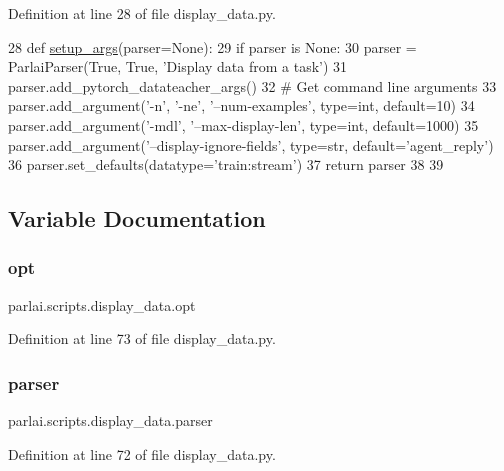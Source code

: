 Definition at line 28 of file display\+\_\+data.\+py.


\begin{DoxyCode}
28 \textcolor{keyword}{def }\hyperlink{namespaceparlai_1_1scripts_1_1display__data_a666e6177939b9a63961e56a1dfdc74b4}{setup\_args}(parser=None):
29     \textcolor{keywordflow}{if} parser \textcolor{keywordflow}{is} \textcolor{keywordtype}{None}:
30         parser = ParlaiParser(\textcolor{keyword}{True}, \textcolor{keyword}{True}, \textcolor{stringliteral}{'Display data from a task'})
31     parser.add\_pytorch\_datateacher\_args()
32     \textcolor{comment}{# Get command line arguments}
33     parser.add\_argument(\textcolor{stringliteral}{'-n'}, \textcolor{stringliteral}{'-ne'}, \textcolor{stringliteral}{'--num-examples'}, type=int, default=10)
34     parser.add\_argument(\textcolor{stringliteral}{'-mdl'}, \textcolor{stringliteral}{'--max-display-len'}, type=int, default=1000)
35     parser.add\_argument(\textcolor{stringliteral}{'--display-ignore-fields'}, type=str, default=\textcolor{stringliteral}{'agent\_reply'})
36     parser.set\_defaults(datatype=\textcolor{stringliteral}{'train:stream'})
37     \textcolor{keywordflow}{return} parser
38 
39 
\end{DoxyCode}


\subsection{Variable Documentation}
\mbox{\label{namespaceparlai_1_1scripts_1_1display__data_a341b3b511b1950a639f21228dd77a5c1}} 
\subsubsection{\texorpdfstring{opt}{opt}}
{\footnotesize\ttfamily parlai.\+scripts.\+display\+\_\+data.\+opt}



Definition at line 73 of file display\+\_\+data.\+py.

\mbox{\label{namespaceparlai_1_1scripts_1_1display__data_a43745c48943804e2c6a6d8d3085e1877}} 
\subsubsection{\texorpdfstring{parser}{parser}}
{\footnotesize\ttfamily parlai.\+scripts.\+display\+\_\+data.\+parser}



Definition at line 72 of file display\+\_\+data.\+py.

